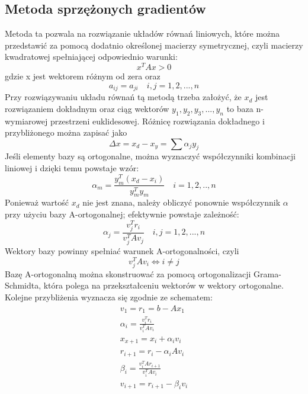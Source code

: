\documentclass{article}
\begin{document}
\subsection{Metoda sprzężonych gradientów}
Metoda ta pozwala na rozwiązanie układów równań liniowych, które można przedstawić za pomocą dodatnio określonej macierzy symetrycznej, czyli macierzy kwadratowej spełniającej odpowiednio warunki:
\begin{equation*}
    x^TAx > 0
\end{equation*}
gdzie x jest wektorem różnym od zera oraz
\begin{equation*}
    a_{ij} = a_{ji} \quad i,j = 1,2,...,n
\end{equation*}
Przy rozwiązywaniu układu równań tą metodą trzeba założyć, że $x_d$ jest rozwiązaniem dokładnym oraz ciąg wektorów ${y_1, y_2, y_3,...,y_n}$ to baza n-wymiarowej przestrzeni euklidesowej.
Różnicę rozwiązania dokładnego i przybliżonego można zapisać jako
\begin{equation*}
    \Delta x = x_d - x_y = \sum \alpha_j y_j
\end{equation*}
Jeśli elementy bazy są ortogonalne, można wyznaczyć współczynniki kombinacji liniowej i dzięki temu powstaje wzór:
\begin{equation*}
    \alpha_m = \frac{y_m^T(x_d-x_i)}{y_m^Ty_m} \quad i=1,2,..,n
\end{equation*}
Ponieważ wartość $x_d$ nie jest znana, należy obliczyć ponownie współczynnik $\alpha$ przy użyciu bazy A-ortogonalnej; efektywnie powstaje zależność:
\begin{equation*}
    \alpha_j = \frac{v_j^Tr_i}{v_j^TAv_j} \quad i,j=1,2,...,n
\end{equation*}
Wektory bazy powinny spełniać warunek A-ortogonalności, czyli
\begin{equation*}
    v_j^TAv_i \Longleftrightarrow i \neq j
\end{equation*}
Bazę A-ortogonalną można skonstruować za pomocą ortogonalizacji Grama-Schmidta, która polega na przekształceniu wektorów w wektory ortogonalne. \\
Kolejne przybliżenia wyznacza się zgodnie ze schematem:
\begin{gather*}
    v_1 = r_1 = b-Ax_1 \\
    \alpha_i = \frac{v_i^Tr_i}{v_i^TAv_i}\\
    x_{x+1} = x_i + \alpha_iv_i\\
    r_{i+1} = r_i - \alpha_iAv_i\\
    \beta_i = \frac{v_i^TAr_{i+1}}{v_i^TAv_i}\\
    v_{i+1} = r_{i+1}-\beta_iv_i
\end{gather*}
\newpage
\end{document}
